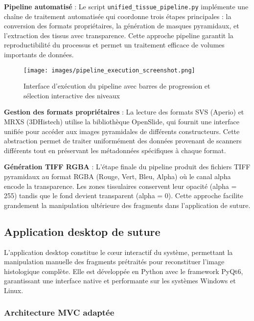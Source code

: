 \textbf{Pipeline automatisé} : Le script \texttt{unified\_tissue\_pipeline.py} implémente une chaîne de traitement automatisée qui coordonne trois étapes principales : la conversion des formats propriétaires, la génération de masques pyramidaux, et l'extraction des tissus avec transparence. Cette approche pipeline garantit la reproductibilité du processus et permet un traitement efficace de volumes importants de données.

\begin{figure}[H]
\centering
\texttt{[image: images/pipeline\_execution\_screenshot.png]}
\caption{Interface d'exécution du pipeline avec barres de progression et sélection interactive des niveaux}
\label{fig:pipeline_execution}
\end{figure}

\textbf{Gestion des formats propriétaires} : La lecture des formats SVS (Aperio) et MRXS (3DHistech) utilise la bibliothèque OpenSlide, qui fournit une interface unifiée pour accéder aux images pyramidales de différents constructeurs. Cette abstraction permet de traiter uniformément des données provenant de scanners différents tout en préservant les métadonnées spécifiques à chaque format.

\textbf{Génération TIFF RGBA} : L'étape finale du pipeline produit des fichiers TIFF pyramidaux au format RGBA (Rouge, Vert, Bleu, Alpha) où le canal alpha encode la transparence. Les zones tissulaires conservent leur opacité (alpha = 255) tandis que le fond devient transparent (alpha = 0). Cette approche facilite grandement la manipulation ultérieure des fragments dans l'application de suture.

\subsection{Application desktop de suture}

L'application desktop constitue le cœur interactif du système, permettant la manipulation manuelle des fragments prétraités pour reconstituer l'image histologique complète. Elle est développée en Python avec le framework PyQt6, garantissant une interface native et performante sur les systèmes Windows et Linux.

\subsubsection{Architecture MVC adaptée}


